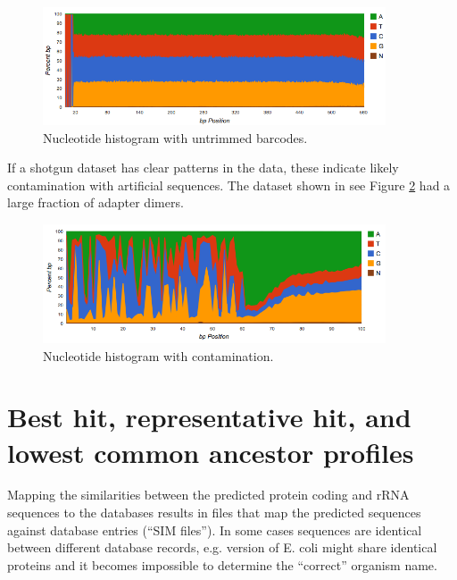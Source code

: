 \documentclass[12pt,fullpage]{report}
\begin{document}
\begin{figure}[ht]
\begin{center}
\includegraphics[width=4in]{Images/nucleotide-hist-barcodes.png}
\end{center}
\caption{
Nucleotide histogram with untrimmed barcodes.
}
\label{fig:nucleotide-hist-barcodes}
\end{figure}

If a shotgun dataset has clear patterns in the data, these indicate likely contamination with artificial sequences.
The dataset shown in see Figure \ref{fig:nucleotide-with-contamination} had a large fraction of adapter dimers.

\begin{figure}
\begin{center}
\includegraphics[width=4in]{Images/nucleotide-with-contamination.png}
\end{center}
\caption{
Nucleotide histogram with contamination.
}
\label{fig:nucleotide-with-contamination}
\end{figure}
\section{Best hit, representative hit, and lowest common ancestor profiles}
\label{section:hit-types}

Mapping the similarities between the predicted protein coding and rRNA sequences to the databases results
in files that map the predicted sequences against database entries (``SIM files'').  In some cases sequences are identical between different database records,
e.g. version of E. coli might share identical proteins and it becomes impossible to determine the ``correct'' organism name.
\end{document}
